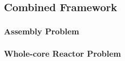 \subsection{Combined Framework} \label{sec43}
\subsubsection{Assembly Problem}
\subsubsection{Whole-core Reactor Problem}
